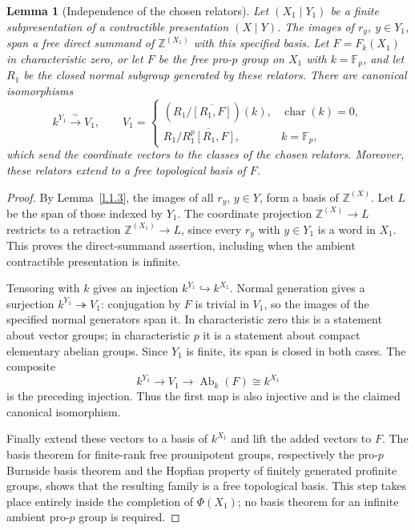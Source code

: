 \documentclass[11pt,a4paper]{article}
\newtheorem{lemma}[theorem]{Lemma}
\begin{document}
\begin{lemma}[Independence of the chosen relators]\label{lem:relator-independence}
Let $(X_1\mid Y_1)$ be a finite subpresentation of a contractible
presentation $(X\mid Y)$.  The images of $r_y$, $y\in Y_1$, span a
free direct summand of $\mathbb Z^{(X_1)}$ with this specified basis.
Let $F=F_k(X_1)$ in characteristic zero, or let $F$ be the free pro-$p$
group on $X_1$ with $k=\mathbb F_p$, and let $R_1$ be the closed normal
subgroup generated by these relators.  There are canonical isomorphisms
\[
 k^{Y_1}\xrightarrow{\ \sim\ }V_1,\qquad
 V_1=\begin{cases}
 (R_1/\overline{[R_1,F]})(k),&\operatorname{char}(k)=0,\\
 R_1/\overline{R_1^p[R_1,F]},&k=\mathbb F_p,
 \end{cases}
\]
which send the coordinate vectors to the classes of the chosen relators.
Moreover, these relators extend to a free topological basis of $F$.
\end{lemma}
\begin{proof}
By Lemma~\ref{l.1.3}, the images of all $r_y$, $y\in Y$, form a basis
of $\mathbb Z^{(X)}$.  Let $L$ be the span of those indexed by $Y_1$.
The coordinate projection $\mathbb Z^{(X)}\to L$ restricts to a
retraction $\mathbb Z^{(X_1)}\to L$, since every $r_y$ with $y\in Y_1$
is a word in $X_1$.  This proves the direct-summand assertion, including
when the ambient contractible presentation is infinite.

Tensoring with $k$ gives an injection $k^{Y_1}\hookrightarrow k^{X_1}$.
Normal generation gives a surjection $k^{Y_1}\twoheadrightarrow V_1$:
conjugation by $F$ is trivial in $V_1$, so the images of the specified
normal generators span it.  In characteristic zero this is a statement
about vector groups; in characteristic $p$ it is a statement about
compact elementary abelian groups.  Since $Y_1$ is finite, its span is
closed in both cases.  The composite
\[
 k^{Y_1}\longrightarrow V_1\longrightarrow\operatorname{Ab}_k(F)
       \cong k^{X_1}
\]
is the preceding injection.  Thus the first map is also injective and
is the claimed canonical isomorphism.

Finally extend these vectors to a basis of $k^{X_1}$ and lift the added
vectors to $F$.  The basis theorem for finite-rank free prounipotent
groups, respectively the pro-$p$ Burnside basis theorem and the Hopfian
property of finitely generated profinite groups, shows that the resulting
family is a free topological basis.  This step takes place entirely
inside the completion of $\Phi(X_1)$; no basis theorem for an infinite
ambient pro-$p$ group is required.
\end{proof}
\end{document}
